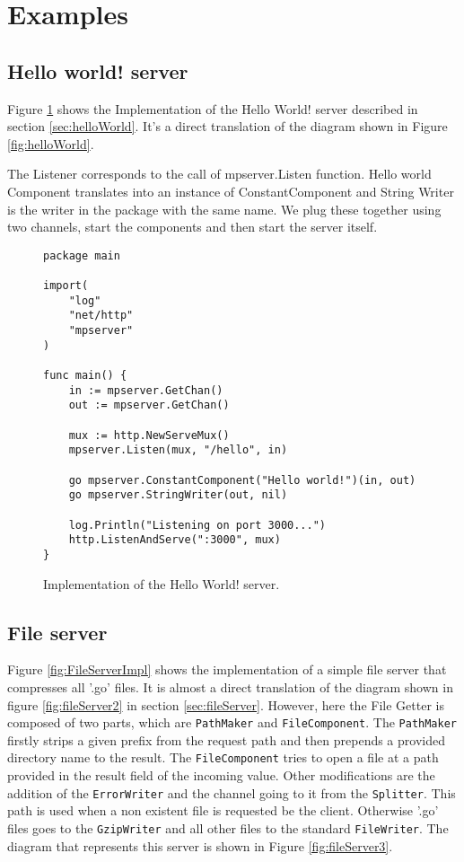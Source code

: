 \documentclass[12pt,a4paper]{article}
\begin{document}
\newpage
\section{Examples}
\label{sec:examples}
\subsection{Hello world! server}
Figure \ref{fig:HelloWorldImpl} shows the Implementation of the Hello World!
server described in section \ref{sec:helloWorld}.
It's a direct translation of the diagram shown in Figure \ref{fig:helloWorld}.

The Listener corresponds to the call of mpserver.Listen function.
Hello world Component translates into an instance of ConstantComponent
and String Writer is the writer in the package with the same name.
We plug these together using two channels, start the components 
and then start the server itself.

\begin{figure}[h]
\centering
\begin{lstlisting}
package main

import(
    "log"
    "net/http"
    "mpserver"
)

func main() {
    in := mpserver.GetChan()
    out := mpserver.GetChan()

    mux := http.NewServeMux()
    mpserver.Listen(mux, "/hello", in)

    go mpserver.ConstantComponent("Hello world!")(in, out)
    go mpserver.StringWriter(out, nil)
    
    log.Println("Listening on port 3000...")
    http.ListenAndServe(":3000", mux)
}
\end{lstlisting}
\caption[scale=1.0]{Implementation of the Hello World! server.}
\label{fig:HelloWorldImpl}
\end{figure}

\newpage
\subsection{File server}
Figure \ref{fig:FileServerImpl} shows the implementation of a simple 
file server that compresses all '.go' files. It is almost a direct translation
of the diagram shown in figure \ref{fig:fileServer2} in section \ref{sec:fileServer}.
However, here the File Getter is composed of two parts, which are \texttt{PathMaker}
and \texttt{FileComponent}. The \texttt{PathMaker} firstly strips a given
prefix from the request path and then prepends a provided directory name to 
the result. The \texttt{FileComponent} tries to open a file at a path 
provided in the result field of the incoming value. Other modifications
are the addition of the \texttt{ErrorWriter} and the channel going to it from
the \texttt{Splitter}.
This path is used when a non existent file is requested be the client.
Otherwise '.go' files goes to the \texttt{GzipWriter} and all other files to 
the standard \texttt{FileWriter}.
The diagram that represents this server is shown in 
Figure \ref{fig:fileServer3}.
\end{document}
